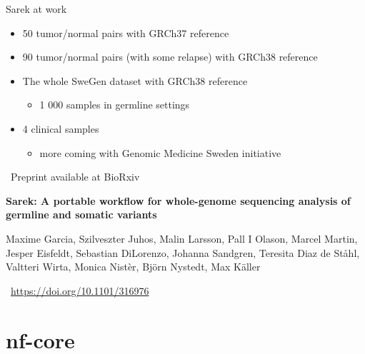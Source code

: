 \documentclass[usepdftitle=false]{beamer}
\begin{document}
\begin{frame}{Sarek at work}
	\begin{itemize}
		\item	50 tumor/normal pairs with GRCh37 reference
		\pause
		\item	90 tumor/normal pairs (with some relapse) with GRCh38 reference
		\pause
		\item	The whole SweGen dataset with GRCh38 reference
		\begin{itemize}
			\item	1 000 samples in germline settings
		\end{itemize}
		\pause
		\item	4 clinical samples
		\begin{itemize}
			\item	more coming with Genomic Medicine Sweden initiative
		\end{itemize}
	\end{itemize}
\end{frame}


\begin{frame}{\faWrench\ Preprint available at BioRxiv}

	\textbf{Sarek: A portable workflow for whole-genome sequencing analysis of germline and somatic variants}

	\small{Maxime Garcia,
	Szilveszter Juhos,
	Malin Larsson,
	Pall I Olason,
	Marcel Martin,
	Jesper Eisfeldt,
	Sebastian DiLorenzo,
	Johanna Sandgren,
	Teresita Diaz de Ståhl,
	Valtteri Wirta,
	Monica Nistèr,
	Björn Nystedt,
	Max Käller}

	\aiDoi\ \url{https://doi.org/10.1101/316976}
\end{frame}


\section{nf-core}
\end{document}
